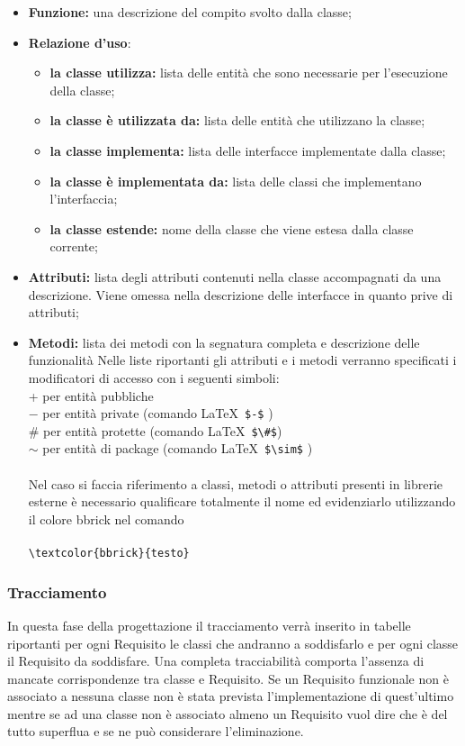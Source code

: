 	\begin{itemize}
	\item \textbf{Funzione:} una descrizione del compito svolto dalla classe;
	\item \textbf{Relazione d’uso}:
	\begin{itemize}
	\item \textbf{la classe utilizza:} lista delle entità che sono necessarie per l’esecuzione della classe;
	\item \textbf{la classe è utilizzata da:} lista delle entità che utilizzano la classe;
	\item \textbf{la classe implementa:} lista delle interfacce implementate dalla classe;
	\item \textbf{la classe è implementata da:} lista delle classi che implementano l’interfaccia;
	\item \textbf{la classe estende:} nome della classe che viene estesa dalla classe corrente;
	\end{itemize}
	\item \textbf{Attributi:} lista degli attributi contenuti nella classe accompagnati da una descrizione. Viene omessa nella descrizione delle interfacce in quanto prive di attributi;
	\item \textbf{Metodi:} lista dei metodi con la segnatura completa e descrizione delle funzionalità Nelle liste riportanti gli attributi e i metodi verranno specificati i modificatori di accesso con i seguenti simboli:\\
    
	+ per entità pubbliche\\
    $-$  per entità private (comando \LaTeX \ \verb|$-$| ) \\
	\#  per entità protette (comando \LaTeX  \ \verb|$\#$|)\\
	$\sim$ per entità di package (comando \LaTeX  \  \verb|$\sim$| ) \\\\
	Nel caso si faccia riferimento a classi, metodi o attributi presenti in librerie esterne è necessario qualificare totalmente il nome ed evidenziarlo utilizzando il	colore bbrick nel comando\\\\
	 
	\verb|\textcolor{bbrick}{testo}| 
	

	\end{itemize}
	\subsubsection{Tracciamento}
	In questa fase della progettazione il tracciamento verrà inserito in tabelle riportanti	per ogni Requisito le classi che andranno a soddisfarlo e per ogni classe il Requisito da soddisfare.
	Una completa tracciabilità comporta l’assenza di mancate corrispondenze tra	classe e Requisito.	Se un Requisito funzionale non è associato a nessuna classe non è stata prevista l’implementazione di quest’ultimo mentre se ad una classe non è associato almeno un Requisito vuol dire che è del tutto superflua e se ne può considerare l’eliminazione.
	
